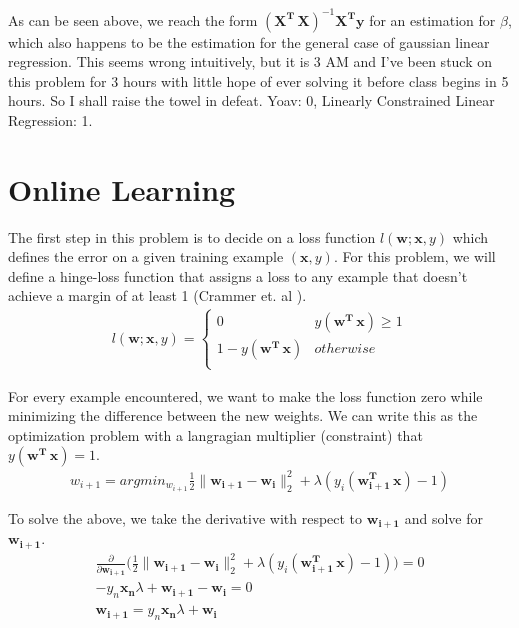\documentclass[12pt]{article}
\begin{document}
	As can be seen above, we reach the form $ (\mathbf{X^T \, X})^{-1} \mathbf{X^T} \mathbf{y}$ for an estimation for $\beta$, which also happens to be the estimation for the general case of gaussian linear regression. This seems wrong intuitively, but it is 3 AM and I've been stuck on this problem for 3 hours with little hope of ever solving it before class begins in 5 hours. So I shall raise the towel in defeat. Yoav: 0, Linearly Constrained Linear Regression: 1.

\section{Online Learning}

	The first step in this problem is to decide on a loss function $l(\mathbf{w}; \mathbf{x}, y)$ which defines the error on a given training example $(\mathbf{x}, y)$. For this problem, we will define a hinge-loss function that assigns a loss to any example that doesn't achieve a margin of at least 1 (Crammer et. al \cite{crammer}).
	\begin{gather*}
		l(\mathbf{w}; \mathbf{x}, y) = \begin{cases}
			0 & y(\mathbf{w^T \, x}) \geq 1 \\
			1 - y(\mathbf{w^T \, x}) & otherwise \\
		\end{cases}
	\end{gather*}

	For every example encountered, we want to make the loss function zero while minimizing the difference between the new weights. We can write this as the optimization problem with a langragian multiplier (constraint) that $y(\mathbf{w^T \, x}) = 1$.
	\begin{gather*}
		w_{i+1} = argmin_{w_{i+1}} \frac{1}{2} \lVert \mathbf{w_{i+1}} - \mathbf{w_i} \rVert^2_2 + \lambda ( y_i(\mathbf{w_{i+1}^T \, x}) - 1)
	\end{gather*}
	
	To solve the above, we take the derivative with respect to $\mathbf{w_{i+1}}$ and solve for $\mathbf{w_{i+1}}$.
	\begin{gather*}
		\frac{\partial}{\partial \mathbf{w_{i+1}}} \bigg( \frac{1}{2} \lVert \mathbf{w_{i+1}} - \mathbf{w_i} \rVert^2_2 + \lambda ( y_i(\mathbf{w_{i+1}^T \, x}) - 1) \bigg) = 0 \\
		-y_n \mathbf{x_n} \lambda + \mathbf{w_{i+1}} - \mathbf{w_i} = 0 \\
		\mathbf{w_{i+1}} = y_n \mathbf{x_n} \lambda + \mathbf{w_i}
	\end{gather*}
	
\end{document}
